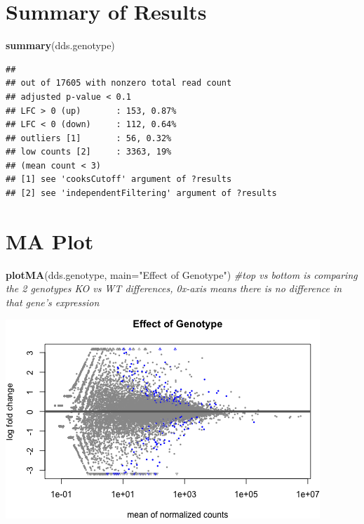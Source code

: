\documentclass[]{article}
\newenvironment{Shaded}{\begin{snugshade}}{\end{snugshade}}
\newcommand{\CommentTok}[1]{\textcolor[rgb]{0.56,0.35,0.01}{\textit{#1}}}
\newcommand{\DataTypeTok}[1]{\textcolor[rgb]{0.13,0.29,0.53}{#1}}
\newcommand{\KeywordTok}[1]{\textcolor[rgb]{0.13,0.29,0.53}{\textbf{#1}}}
\newcommand{\NormalTok}[1]{#1}
\newcommand{\StringTok}[1]{\textcolor[rgb]{0.31,0.60,0.02}{#1}}
\begin{document}
\hypertarget{summary-of-results}{%
\section{Summary of Results}\label{summary-of-results}}

\begin{Shaded}
\begin{Highlighting}[]
\KeywordTok{summary}\NormalTok{(dds.genotype) }
\end{Highlighting}
\end{Shaded}

\begin{verbatim}
## 
## out of 17605 with nonzero total read count
## adjusted p-value < 0.1
## LFC > 0 (up)       : 153, 0.87%
## LFC < 0 (down)     : 112, 0.64%
## outliers [1]       : 56, 0.32%
## low counts [2]     : 3363, 19%
## (mean count < 3)
## [1] see 'cooksCutoff' argument of ?results
## [2] see 'independentFiltering' argument of ?results
\end{verbatim}

\hypertarget{ma-plot}{%
\section{MA Plot}\label{ma-plot}}

\begin{Shaded}
\begin{Highlighting}[]
\KeywordTok{plotMA}\NormalTok{(dds.genotype, }\DataTypeTok{main=}\StringTok{"Effect of Genotype"}\NormalTok{) }\CommentTok{#top vs bottom is comparing the 2 genotypes KO vs WT differences, 0x-axis means there is no difference in that gene's expression }
\end{Highlighting}
\end{Shaded}

\includegraphics{figures-noura/ma-plot-1.png}
\end{document}
